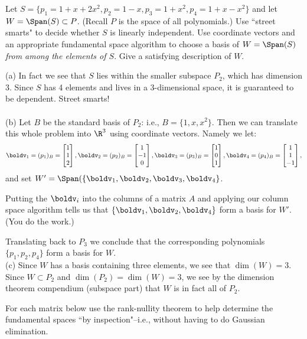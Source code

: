 \ii Let $S=\{p_1=1+x+2x^2,p_2=1-x,p_3=1+x^2,p_4=1+x-x^2\}$ and let $W=\Span(S)\subset P$.  (Recall $P$ is the space of all polynomials.) 
\bb
\ii Use ``street smarts" to decide whether $S$ is linearly independent. 
\ii Use coordinate vectors and an appropriate fundamental space algorithm to choose a basis of $W=\Span(S)$ {\em from among the elements of $S$}.
\ii Give a satisfying description of $W$. 
\ee
\begin{solution}
\noindent 
(a) In fact we see that $S$ lies within the smaller subspace $P_2$, which has dimension $3$. Since $S$ has 4 elements and lives in a 3-dimensional space, it is guaranteed to be dependent. Street smarts! 
\\ \\
(b) Let $B$ be the standard basis of $P_2$: i.e., $B=\{1,x,x^2\}$. Then we can translate this whole problem into $\R^3$ using coordinate vectors. Namely we let:
\[
\boldv_1=(p_1)_B=\begin{bmatrix}
1\\ 1\\ 2
\end{bmatrix}, \boldv_2=(p_2)_B=\begin{bmatrix}
1\\ -1\\ 0
\end{bmatrix}, \boldv_3=(p_3)_B=\begin{bmatrix}
1\\0 \\ 1
\end{bmatrix}, \boldv_4=(p_4)_B=\begin{bmatrix}
1\\ 1\\ -1
\end{bmatrix},
\]
and set $W'=\Span(\{\boldv_1,\boldv_2,\boldv_3,\boldv_4\}$. 

Putting the $\boldv_i$ into the columns of a matrix $A$ and applying our column space algorithm tells us that $\{\boldv_1,\boldv_2,\boldv_4\}$ form a basis for $W'$. (You do the work.) 

Translating back to $P_3$ we conclude that the corresponding polynomials $\{p_1,p_2,p_4\}$ form a basis for $W$. 
\\
(c) Since $W$ has a basis containing three elements, we see that $\dim(W)=3$. Since $W\subset P_2$ and $\dim(P_2)=\dim(W)=3$, we see by the dimension theorem compendium (subspace part)  that $W$ is in fact all of $P_2$. 
\end{solution}
\ii For each matrix below use the rank-nullity theorem to help determine the fundamental spaces ``by inspection"--i.e., without having to do Gaussian elimination. 

